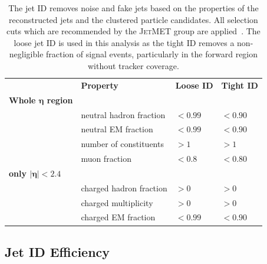 \begin{table}[htbp]
    \centering
    \caption[Jet ID criteria]{The jet ID removes noise and fake jets based on
        the properties of the reconstructed jets and the clustered particle
        candidates. All selection cuts which are recommended by the
        \textsc{JetMET} group are applied~\cite{jetmet:jetid}. The loose jet ID is
        used in this analysis as the tight ID removes a non-negligible fraction
        of signal events, particularly in the forward region without tracker
        coverage.}
    \label{tab:jetid}
    \begin{tabular}{llll}
    \toprule
                                 & \textbf{Property}       & \textbf{Loose ID} & \textbf{Tight ID}\\\cmidrule(lr){2-4}
                                 \textbf{Whole $\bm{\eta}$ region} &                         &                   & \\\cmidrule(lr){1-1}
                                 & neutral hadron fraction & $< 0.99$          & $< 0.90$\\
                                 & neutral EM fraction     & $< 0.99$          & $< 0.90$\\
                                 & number of constituents  & $> 1$             & $> 1$\\
                                 & muon fraction           & $< 0.8$           & $< 0.80$\\
                                 \textbf{only $\bm{|\eta| < 2.4}$} &                         &                   & \\\cmidrule(lr){1-1}
                                 & charged hadron fraction & $> 0$             & $> 0$\\
                                 & charged multiplicity    & $> 0$             & $> 0$\\
                                 & charged EM fraction     & $< 0.99$          & $< 0.90$\\
    \bottomrule
    \end{tabular}
\end{table}


\subsection{Jet ID Efficiency}

